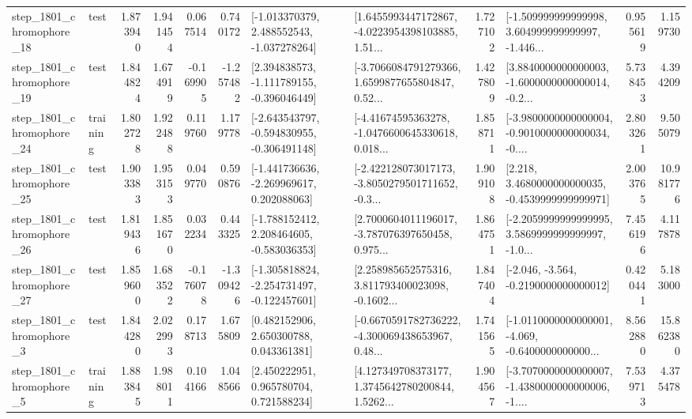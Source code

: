\begin{tabular}{llrrrrllrlrr}
 step\_1801\_chromophore\_18 &      test &      1.873940 &    1.941454 &      0.067514 &  0.740172 &   [-1.013370379, 2.488552543, -1.037278264] &  [1.6455993447172867, -4.0223954398103885, 1.51... &       1.727102 &  [-1.509999999999998, 3.604999999999997, -1.446... &            0.955619 &          1.159730 \\
 step\_1801\_chromophore\_19 &      test &      1.844824 &    1.674919 &     -0.169905 & -1.257482 &   [2.394838573, -1.111789155, -0.396046449] &  [-3.7066084791279366, 1.6599877655804847, 0.52... &       1.427809 &  [3.8840000000000003, -1.6000000000000014, -0.2... &            5.738453 &          4.394209 \\
 step\_1801\_chromophore\_24 &  training &      1.802728 &    1.922488 &      0.119760 &  1.179778 &  [-2.643543797, -0.594830955, -0.306491148] &  [-4.41674595363278, -1.0476600645330618, 0.018... &       1.858711 &  [-3.9800000000000004, -0.9010000000000034, -0.... &            2.803261 &          9.505079 \\
 step\_1801\_chromophore\_25 &      test &      1.903383 &    1.953153 &      0.049770 &  0.590876 &   [-1.441736636, -2.269969617, 0.202088063] &  [-2.422128073017173, -3.8050279501711652, -0.3... &       1.909108 &   [2.218, 3.4680000000000035, -0.4539999999999971] &            2.003765 &         10.981776 \\
 step\_1801\_chromophore\_26 &      test &      1.819436 &    1.851670 &      0.032234 &  0.443325 &   [-1.788152412, 2.208464605, -0.583036353] &  [2.7000604011196017, -3.787076397650458, 0.975... &       1.864751 &  [-2.2059999999999995, 3.5869999999999997, -1.0... &            7.456196 &          4.117878 \\
 step\_1801\_chromophore\_27 &      test &      1.859600 &    1.683522 &     -0.176078 & -1.309426 &  [-1.305818824, -2.254731497, -0.122457601] &  [2.258985652575316, 3.811793400023098, -0.1602... &       1.847404 &              [-2.046, -3.564, -0.2190000000000012] &            0.420441 &          5.183000 \\
  step\_1801\_chromophore\_3 &      test &      1.844280 &    2.022993 &      0.178713 &  1.675809 &     [0.482152906, 2.650300788, 0.043361381] &  [-0.6670591782736222, -4.300069438653967, 0.48... &       1.741565 &  [-1.0110000000000001, -4.069, -0.6400000000000... &            8.562880 &         15.862380 \\
  step\_1801\_chromophore\_5 &  training &      1.883845 &    1.988011 &      0.104166 &  1.048566 &     [2.450222951, 0.965780704, 0.721588234] &  [4.127349708373177, 1.3745642780200844, 1.5262... &       1.904567 &  [-3.7070000000000007, -1.4380000000000006, -1.... &            7.539713 &          4.375478 \\

\end{tabular}
